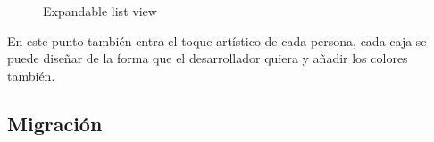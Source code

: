 \begin{figure}[H] 
  \begin{center} 
    \caption{Expandable list view} 
    \label{fig:ExpandableList} 
  \end{center} 
\end{figure}

En este punto también entra el toque artístico de cada persona, cada caja se puede diseñar de la forma que el desarrollador quiera y añadir los colores también.

\subsection{Migración}
\label{subsecc:Migración}

